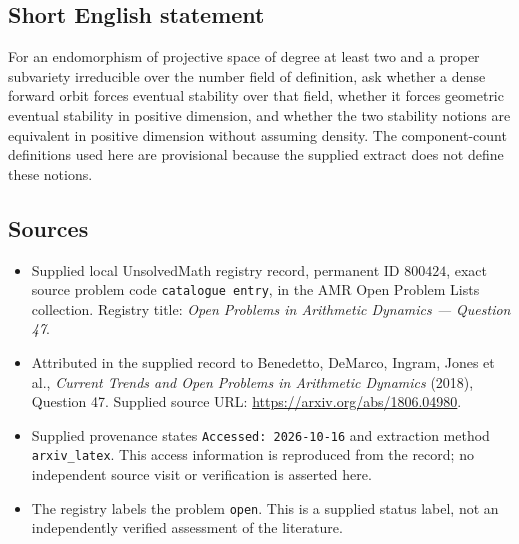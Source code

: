 \documentclass[11pt]{article}
\begin{document}
\subsection{Short English statement}
For an endomorphism of projective space of degree at least two and a proper subvariety irreducible over the number field of definition, ask whether a dense forward orbit forces eventual stability over that field, whether it forces geometric eventual stability in positive dimension, and whether the two stability notions are equivalent in positive dimension without assuming density. The component-count definitions used here are provisional because the supplied extract does not define these notions.
\subsection{Sources}
\begin{itemize}
\item Supplied local UnsolvedMath registry record, permanent ID \(800424\), exact source problem code \texttt{catalogue entry}, in the AMR Open Problem Lists collection. Registry title: \emph{Open Problems in Arithmetic Dynamics --- Question 47}.
\item Attributed in the supplied record to Benedetto, DeMarco, Ingram, Jones et al., \emph{Current Trends and Open Problems in Arithmetic Dynamics} (2018), Question 47. Supplied source URL: \url{https://arxiv.org/abs/1806.04980}.
\item Supplied provenance states \texttt{Accessed: 2026-10-16} and extraction method \texttt{arxiv\_latex}. This access information is reproduced from the record; no independent source visit or verification is asserted here.
\item The registry labels the problem \texttt{open}. This is a supplied status label, not an independently verified assessment of the literature.
\end{itemize}
\end{document}
